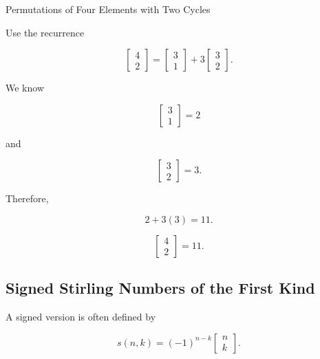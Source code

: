 \begin{workedexamplebox}{Permutations of Four Elements with Two Cycles}

Use the recurrence

\[
\left[
\begin{matrix}
4\\
2
\end{matrix}
\right]
=
\left[
\begin{matrix}
3\\
1
\end{matrix}
\right]
+
3
\left[
\begin{matrix}
3\\
2
\end{matrix}
\right].
\]

We know

\[
\left[
\begin{matrix}
3\\
1
\end{matrix}
\right]
=2
\]

and

\[
\left[
\begin{matrix}
3\\
2
\end{matrix}
\right]
=3.
\]

Therefore,

\[
2+3(3)=11.
\]

\begin{answerbox}
\[
\boxed{
\left[
\begin{matrix}
4\\
2
\end{matrix}
\right]
=
11.
}
\]
\end{answerbox}

\end{workedexamplebox}

\subsection{Signed Stirling Numbers of the First Kind}
\label{subsec:signed-stirling-first}

A signed version is often defined by

\[
\boxed{
s(n,k)
=
(-1)^{n-k}
\left[
\begin{matrix}
n\\
k
\end{matrix}
\right].
}
\]

